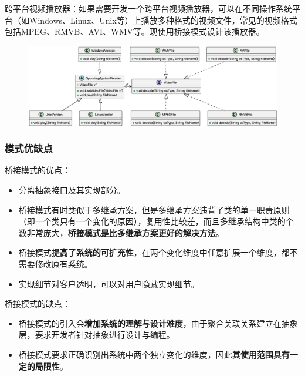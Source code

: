 跨平台视频播放器：如果需要开发一个跨平台视频播放器，可以在不同操作系统平台（如Windows、Linux、Unix等）上播放多种格式的视频文件，常见的视频格式包括MPEG、RMVB、AVI、WMV等。现使用桥接模式设计该播放器。
\begin{figure}[H]
    \vspace{-0.5em}
	\centering
	\includegraphics[width=\textwidth]{images/桥接模式实例2.eps}
    \vspace{-1em}
\end{figure}

\subsubsection{模式优缺点}
桥接模式的优点：
\begin{itemize}
    \item 分离抽象接口及其实现部分。
    \item 桥接模式有时类似于多继承方案，但是多继承方案违背了类的单一职责原则（即一个类只有一个变化的原因），复用性比较差，而且多继承结构中类的个数非常庞大，\textbf{桥接模式是比多继承方案更好的解决方法}。
    \item 桥接模式\textbf{提高了系统的可扩充性}，在两个变化维度中任意扩展一个维度，都不需要修改原有系统。
    \item 实现细节对客户透明，可以对用户隐藏实现细节。
\end{itemize}

桥接模式的缺点：
\begin{itemize}
    \item 桥接模式的引入会\textbf{增加系统的理解与设计难度}，由于聚合关联关系建立在抽象层，要求开发者针对抽象进行设计与编程。
    \item 桥接模式要求正确识别出系统中两个独立变化的维度，因此\textbf{其使用范围具有一定的局限性}。
\end{itemize}

